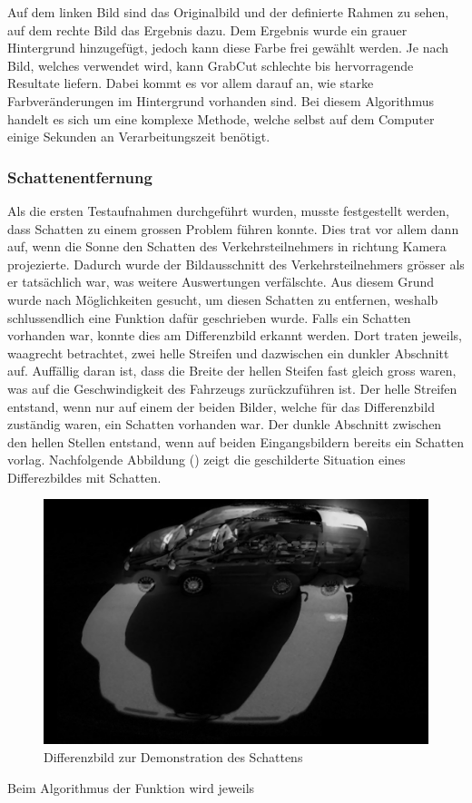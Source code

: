 Auf dem linken Bild sind das Originalbild und der definierte Rahmen zu sehen, auf dem rechte Bild das Ergebnis dazu. Dem Ergebnis wurde ein grauer Hintergrund hinzugefügt, jedoch kann diese Farbe frei gewählt werden. Je nach Bild, welches verwendet wird, kann GrabCut schlechte bis hervorragende Resultate liefern. Dabei kommt es vor allem darauf an, wie starke Farbveränderungen im Hintergrund vorhanden sind. Bei diesem Algorithmus handelt es sich um eine komplexe Methode, welche selbst auf dem Computer einige Sekunden an Verarbeitungszeit benötigt. \cite{GrabCut}

\subsubsection{Schattenentfernung}
Als die ersten Testaufnahmen durchgeführt wurden, musste festgestellt werden, dass Schatten zu einem grossen Problem führen konnte. Dies trat vor allem dann auf, wenn die Sonne den Schatten des Verkehrsteilnehmers in richtung Kamera projezierte. Dadurch wurde der Bildausschnitt des Verkehrsteilnehmers grösser als er tatsächlich war, was weitere Auswertungen verfälschte. Aus diesem Grund wurde nach Möglichkeiten gesucht, um diesen Schatten zu entfernen, weshalb schlussendlich eine Funktion dafür geschrieben wurde.
Falls ein Schatten vorhanden war, konnte dies am Differenzbild erkannt werden. Dort traten jeweils, waagrecht betrachtet, zwei helle Streifen und dazwischen ein dunkler Abschnitt auf. Auffällig daran ist, dass die Breite der hellen Steifen fast gleich gross waren, was auf die Geschwindigkeit des Fahrzeugs zurückzuführen ist. Der helle Streifen entstand, wenn nur auf einem der beiden Bilder, welche für das Differenzbild zuständig waren, ein Schatten vorhanden war. Der dunkle Abschnitt zwischen den hellen Stellen entstand, wenn auf beiden Eingangsbildern bereits ein Schatten vorlag. Nachfolgende Abbildung () zeigt die geschilderte Situation eines Differezbildes mit Schatten.

\begin{figure}[H]
  \centering
  \includegraphics[height=0.3\textheight]{Testversuche/BlurRemoveShadow.jpg} 
  \caption{Differenzbild zur Demonstration des Schattens}
  \label{bBlurRemoveShadow}
\end{figure} 

Beim Algorithmus der Funktion wird jeweils 